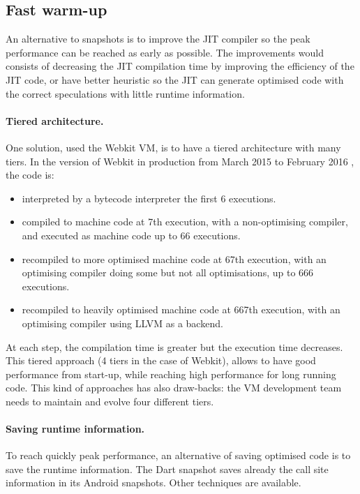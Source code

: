 \documentclass[a4paper,12pt,twoside]{../includes/ThesisStyle}
\begin{document}
\subsection{Fast warm-up}

An alternative to snapshots is to improve the JIT compiler so the peak performance can be reached as early as possible. The improvements would consists of decreasing the JIT compilation time by improving the efficiency of the JIT code, or have better heuristic so the JIT can generate optimised code with the correct speculations with little runtime information.

\paragraph{Tiered architecture.}
One solution, used the Webkit VM\cite{Webkit15}, is to have a tiered architecture with many tiers. In the version of Webkit in production from March 2015 to February 2016 \cite{Webkit15}, the code is:
\begin{itemize}
\item interpreted by a bytecode interpreter the first 6 executions.
\item compiled to machine code at 7th execution, with a non-optimising compiler, and executed as machine code up to 66 executions.
\item recompiled to more optimised machine code at 67th execution, with an optimising compiler doing some but not all optimisations, up to 666 executions.
\item recompiled to heavily optimised machine code at 667th execution, with an optimising compiler using LLVM as a backend.
\end{itemize}

At each step, the compilation time is greater but the execution time decreases. This tiered approach (4 tiers in the case of Webkit), allows to have good performance from start-up, while reaching high performance for long running code. This kind of approaches has also draw-backs: the VM development team needs to maintain and evolve four different tiers.

\paragraph{Saving runtime information.}

To reach quickly peak performance, an alternative of saving optimised code is to save the runtime information. The Dart snapshot saves already the call site information in its Android snapshots. Other techniques are available.
\end{document}
